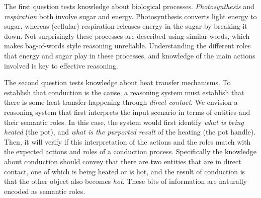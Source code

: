

The first question tests knowledge about biological processes.
{\em Photosynthesis} and {\em respiration} both involve sugar and energy. 
Photosynthesis converts light energy to sugar, whereas (cellular) respiration releases energy in the sugar by breaking it down. 
Not surprisingly these processes are described using similar words, which makes bag-of-words style reasoning unreliable. 
Understanding the different roles that energy and sugar play in these processes, and knowledge of the main actions involved is key to effective reasoning.

The second question tests knowledge about heat transfer mechanisms.
To establish that conduction is the cause, a reasoning system must establish that there is some heat transfer happening through {\em direct contact}. 
We envision a reasoning system that first interprets the input scenario in terms of entities and their semantic roles. 
In this case, the system would first identify {\em what is being heated} (the pot), and {\em what is the purported result} of the heating (the pot handle). 
Then, it will verify if this interpretation of the actions and the roles match with the expected actions and roles of a conduction process. 
Specifically the knowledge about conduction should convey that there are two entities that are in direct contact, one of which is being heated or is hot, 
and the result of conduction is that the other object also becomes {\em hot}. 
These bits of information are naturally encoded as semantic roles.

